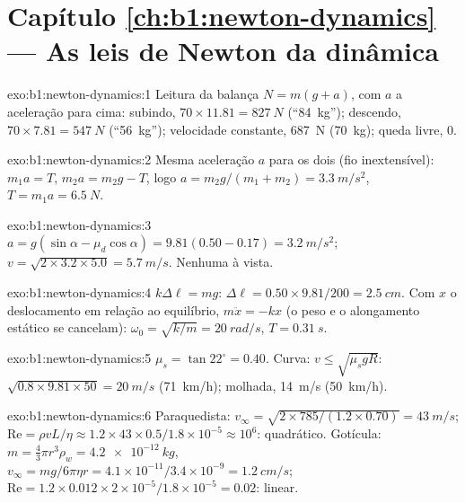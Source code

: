 \section*{Capítulo \ref{ch:b1:newton-dynamics} --- As leis de Newton da dinâmica}

\begin{solution}{exo:b1:newton-dynamics:1}
Leitura da balança $N = m(g + a)$, com $a$ a aceleração para cima: subindo,
$70 \times 11.81 = \qty{827}{N}$ (``\qty{84}{kg}''); descendo, $70 \times 7.81 =
\qty{547}{N}$ (``\qty{56}{kg}''); velocidade constante, \qty{687}{N}
(\qty{70}{kg}); queda livre, $0$.
\end{solution}

\begin{solution}{exo:b1:newton-dynamics:2}
Mesma aceleração $a$ para os dois (fio inextensível): $m_1a = T$,
$m_2a = m_2g - T$, logo $a = m_2g/(m_1 + m_2) = \qty{3.3}{m/s^2}$,
$T = m_1a = \qty{6.5}{N}$.
\end{solution}

\begin{solution}{exo:b1:newton-dynamics:3}
$a = g(\sin\alpha - \mu_d\cos\alpha) = 9.81(0.50 - 0.17) = \qty{3.2}{m/s^2}$;
$v = \sqrt{2 \times 3.2 \times 5.0} = \qty{5.7}{m/s}$. Nenhuma  à vista.
\end{solution}

\begin{solution}{exo:b1:newton-dynamics:4}
$k\Delta\ell = mg$: $\Delta\ell = 0.50 \times 9.81/200 = \qty{2.5}{cm}$.
Com $x$ o deslocamento em relação ao equilíbrio, $m\ddot x = -kx$ (o peso
e o alongamento estático se cancelam): $\omega_0 = \sqrt{k/m} = \qty{20}{rad/s}$,
$T = \qty{0.31}{s}$.
\end{solution}

\begin{solution}{exo:b1:newton-dynamics:5}
$\mu_s = \tan 22^\circ = 0.40$. Curva: $v \leq \sqrt{\mu_sgR}$: $\sqrt{0.8
\times 9.81 \times 50} = \qty{20}{m/s}$ (\qty{71}{km/h}); molhada,
\qty{14}{m/s} (\qty{50}{km/h}).
\end{solution}

\begin{solution}{exo:b1:newton-dynamics:6}
Paraquedista: $v_\infty = \sqrt{2 \times 785/(1.2 \times 0.70)} = \qty{43}{m/s}$;
$\mathrm{Re} = \rho vL/\eta \approx 1.2 \times 43 \times 0.5/1.8\times10^{-5}
\approx 10^6$: quadrático. Gotícula: $m = \tfrac43\pi r^3\rho_w = \qty{4.2e-12}{kg}$,
$v_\infty = mg/6\pi\eta r = 4.1\times10^{-11}/3.4\times10^{-9} = \qty{1.2}{cm/s}$;
$\mathrm{Re} = 1.2 \times 0.012 \times 2\times10^{-5}/1.8\times10^{-5} = 0.02$:
linear.
\end{solution}

